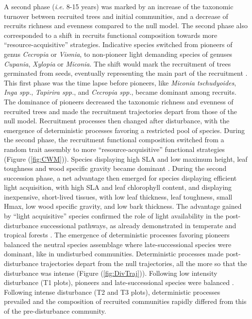 \documentclass[fleqn,10pt]{ArtEcoFoG} %
\begin{document}
A second phase (\emph{i.e.} 8-15 years) was marked by an increase of the
taxonomic turnover between recruited trees and initial communities, and
a decrease of recruits richness and evenness compared to the null model.
The second phase also corresponded to a shift in recruits functional
composition towards more ``resource-acquisitive'' strategies. Indicative
species switched from pioneers of genus \emph{Cecropia} or
\emph{Vismia}, to non-pioneer light demanding species of genuses
\emph{Cupania}, \emph{Xylopia} or \emph{Miconia}. The shift would mark
the recruitment of trees germinated from seeds, eventually representing
the main part of the recruitment \citep{Lawton1988}. This first phase
was the time lapse before pioneers, like \emph{Miconia tschudyoides},
\emph{Inga spp.}, \emph{Tapirira spp.}, and \emph{Cecropia spp.}, became
dominant among recruits. The dominance of pioneers decreased the
taxonomic richness and evenness of recruited trees and made the
recruitment trajectories depart from those of the null model.
Recruitment processes then changed after disturbance, with the emergence
of deterministic processes favoring a restricted pool of species. During
the second phase, the recruitment functional composition switched from a
random trait assembly to more ``resource-acquisitive'' functional
strategies (Figure (\ref{fig:CWM})). Species displaying high SLA and low
maximum height, leaf toughness and wood specific gravity became dominant
\citep{Wright2004, Chave2009b, Herault2011}. During the second
succession phase, a net advantage then emerged for species displaying
efficient light acquisition, with high SLA and leaf chlorophyll content,
and displaying inexpensive, short-lived tissues, with low leaf
thickness, leaf toughness, small Hmax, low wood specific gravity, and
low bark thickness. The advantage gained by ``light acquisitive''
species confirmed the role of light availability in the post-disturbance
successional pathways, as already demonstrated in temperate and tropical
forests \citep{Pena2008, Carreno2012, Kunstler2016, Both2019}. The
emergence of deterministic processes favoring pioneers balanced the
neutral species assemblage where late-successional species were
dominant, like in undisturbed communities. Deterministic processes made
post-disturbance trajectories depart from the null trajectories, all the
more so that the disturbance was intense (Figure (\ref{fig:DivTraj})).
Following low intensity disturbance (T1 plots), pioneers and
late-successional species were balanced \citep{Bongers2009}. Following
intense disturbance (T2 and T3 plots), deterministic processes prevailed
and the composition of recruited communities rapidly differed from this
of the pre-disturbance community.
\end{document}
